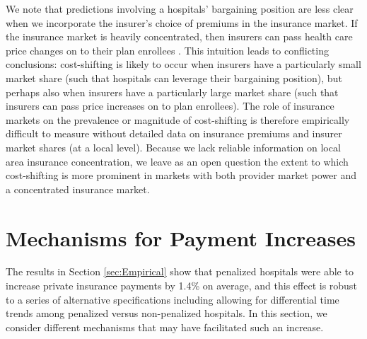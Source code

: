 \documentclass[12pt]{article}
\begin{document}
We note that predictions involving a hospitals' bargaining position are less clear when we incorporate the insurer's choice of premiums in the insurance market. If the insurance market is heavily concentrated, then insurers can pass health care price changes on to their plan enrollees \citep{trish2015,ho2017}. This intuition leads to conflicting conclusions: cost-shifting is likely to occur when insurers have a particularly small market share (such that hospitals can leverage their bargaining position), but perhaps also when insurers have a particularly large market share (such that insurers can pass price increases on to plan enrollees). The role of insurance markets on the prevalence or magnitude of cost-shifting is therefore empirically difficult to measure without detailed data on insurance premiums and insurer market shares (at a local level). Because we lack reliable information on local area insurance concentration, we leave as an open question the extent to which cost-shifting is more prominent in markets with both provider market power and a concentrated insurance market.


\section{Mechanisms for Payment Increases}
\label{sec:alt}
The results in Section \ref{sec:Empirical} show that penalized hospitals were able to increase private insurance payments by 1.4\% on average, and this effect is robust to a series of alternative specifications including allowing for differential time trends among penalized versus non-penalized hospitals. In this section, we consider different mechanisms that may have facilitated such an increase.
\end{document}
